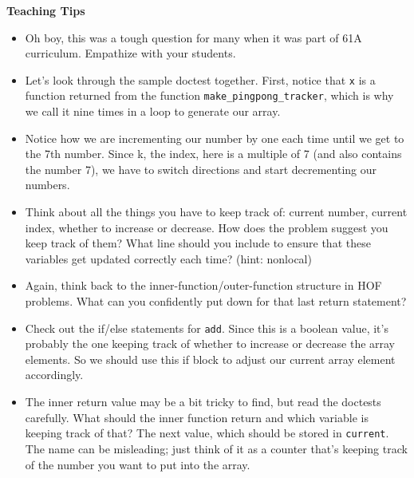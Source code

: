 \begin{blocksection}
\begin{guide}
\textbf{Teaching Tips}
\begin{itemize}
\item Oh boy, this was a tough question for many when it was part of 61A curriculum. Empathize with your students. 
\item Let's look through the sample doctest together. First, notice that \texttt{x} is a function returned from the function \texttt{make\_pingpong\_tracker}, which is why we call it nine times in a loop to generate our array.
\item Notice how we are incrementing our number by one each time until we get to the 7th number. Since k, the index, here is a multiple of 7 (and also contains the number 7), we have to switch directions and start decrementing our numbers.
\item Think about all the things you have to keep track of: current number, current index, whether to increase or decrease. How does the problem suggest you keep track of them? What line should you include to ensure that these variables get updated correctly each time? (hint: nonlocal)
\item Again, think back to the inner-function/outer-function structure in HOF problems. What can you confidently put down for that last return statement?
\item Check out the if/else statements for \texttt{add}. Since this is a boolean value, it's probably the one keeping track of whether to increase or decrease the array elements. So we should use this if block to adjust our current array element accordingly.
\item The inner return value may be a bit tricky to find, but read the doctests carefully. What should the inner function return and which variable is keeping track of that? The next value, which should be stored in \texttt{current}. The name can be misleading; just think of it as a counter that's keeping track of the number you want to put into the array.
\end{itemize}
\end{guide}
\end{blocksection}
